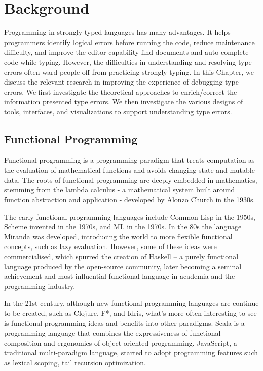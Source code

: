 


\chapter{Background}
\label{chap:background} 

Programming in strongly typed languages has many advantages. It helps programmers identify logical errors before running the code, reduce maintenance difficulty, and improve the editor capability find documents and auto-complete code while typing. However, the difficulties in understanding and resolving type errors often ward people off  from practicing strongly typing.  In this Chapter, we discuss the relevant research in improving the experience of debugging type errors. We first investigate the theoretical approaches to enrich/correct the information presented type errors. We then  investigate the various designs of tools, interfaces, and visualizations to support understanding type errors.

\graphicspath{{Figures/Background}}




\section{Functional Programming}

Functional programming is a programming paradigm that treats computation as the evaluation of mathematical functions and avoids changing state and mutable data. The roots of functional programming are deeply embedded in mathematics, stemming from the lambda calculus - a mathematical system built around function abstraction and application - developed by Alonzo Church in the 1930s.


The early functional programming languages include Common Lisp in the 1950s, Scheme invented in the 1970s, and ML in the 1970s. In the 80s  the language Miranda was developed, introducing the world to more flexible functional concepts, such as lazy evaluation. However, some of these ideas were commercialised, which spurred the creation of Haskell – a purely functional language produced by the open-source community, later becoming a seminal achievement and most influential functional language in academia and the programming industry.


In the 21st century, although new functional programming languages are continue to be created, such as Clojure, F*, and Idris, what’s more often interesting to see is functional programming ideas and benefits into other paradigms. Scala is a programming language that combines the expressiveness of functional composition and ergonomics of object oriented programming. JavaScript, a traditional multi-paradigm language, started to adopt programming features such as lexical scoping, tail recursion optimization.


